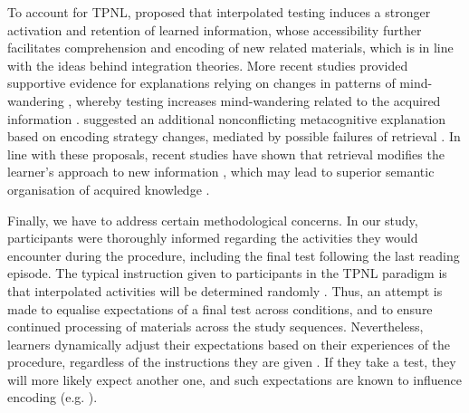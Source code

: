 \documentclass[../main.tex]{subfiles}
\begin{document}
To account for TPNL, \cite{wissmanInterimTestEffect2011} proposed that 
interpolated testing induces a stronger activation and retention of learned 
information, whose accessibility further facilitates comprehension and 
encoding of new related materials, which is in line with the ideas behind 
integration theories. More recent studies provided supportive evidence for 
explanations relying on changes in patterns of mind-wandering 
\citep{szpunarInterpolatedMemoryTests2013}, whereby testing increases 
mind-wandering related to the acquired information
\citep{jingInterpolatedTestingInfluences2016}. 
\cite{wissmanInterimTestEffect2011} suggested an additional nonconflicting 
metacognitive explanation based on encoding strategy changes, mediated by 
possible failures of retrieval 
\citep{bahrickImportanceRetrievalFailures2005}. In line with these 
proposals, recent studies have shown that retrieval modifies the learner's 
approach to new information \citep{choTestingEnhancesBoth2017, 
soderstromTestingFacilitatesRegulation2014}, which may lead to superior 
semantic organisation of acquired knowledge 
\citep{chanTestingPotentiatesNew2018, jingInterpolatedTestingInfluences2016}.

Finally, we have to address certain methodological concerns.  In our study, 
participants were thoroughly informed regarding the activities they would 
encounter during the procedure, including the final test following the last 
reading episode. The typical instruction given to participants in the TPNL 
paradigm is that interpolated activities will be determined randomly
\citep{yangEnhancingLearningRetrieval2018}. Thus, an attempt is made to 
equalise expectations of a final test across conditions, and to ensure 
continued processing of materials across the study sequences. Nevertheless, 
learners dynamically adjust their expectations based on their experiences of 
the procedure, regardless of the instructions they are given 
\citep{weinsteinRoleTestExpectancy2014}.  If they take a test, they will 
more likely expect another one, and such expectations are known to influence 
encoding (e.g. \citealp{szpunarExpectationFinalCumulative2007}). 
\end{document}
